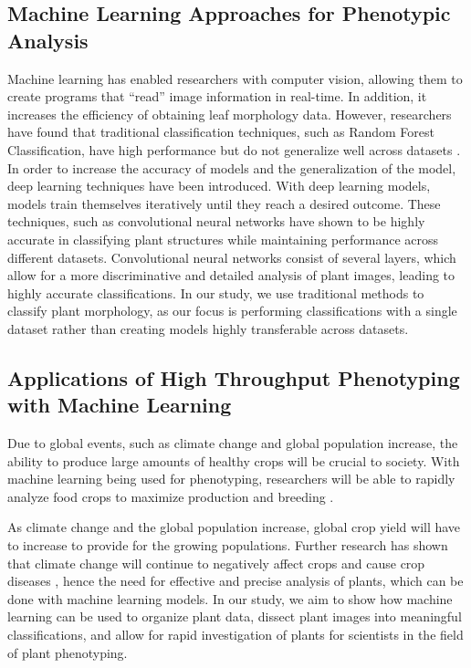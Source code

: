 \documentclass[final,5p,times,twocolumn,authoryear]{elsarticle}
\begin{document}
\subsection{Machine Learning Approaches for Phenotypic Analysis}
\label{related_works_2}

Machine learning has enabled researchers with computer vision, allowing them to create programs that “read” image information in real-time. In addition, it increases the efficiency of obtaining leaf morphology data. However, researchers have found that traditional classification techniques, such as Random Forest Classification, have high performance but do not generalize well across datasets \citep{pound2017deep}. In order to increase the accuracy of models and the generalization of the model, deep learning techniques have been introduced. With deep learning models, models train themselves iteratively until they reach a desired outcome. These techniques, such as convolutional neural networks \citep{koh2021automated, pound2017deep} have shown to be highly accurate in classifying plant structures while maintaining performance across different datasets. Convolutional neural networks consist of several layers, which allow for a more discriminative and detailed analysis of plant images, leading to highly accurate classifications. In our study, we use traditional methods to classify plant morphology, as our focus is performing classifications with a single dataset rather than creating models highly transferable across datasets.

\subsection{Applications of High Throughput Phenotyping with Machine Learning}
\label{related_works_3}

Due to global events, such as climate change and global population increase, the ability to produce large amounts of healthy crops will be crucial to society. With machine learning being used for phenotyping, researchers will be able to rapidly analyze food crops to maximize production and breeding \citep{arya2022deep, shakoor2017high}.

As climate change and the global population increase, global crop yield will have to increase to provide for the growing populations. Further research has shown that climate change will continue to negatively affect crops and cause crop diseases \citep{newton2011implications}, hence the need for effective and precise analysis of plants, which can be done with machine learning models. In our study, we aim to show how machine learning can be used to organize plant data, dissect plant images into meaningful classifications, and allow for rapid investigation of plants for scientists in the field of plant phenotyping.
\end{document}
